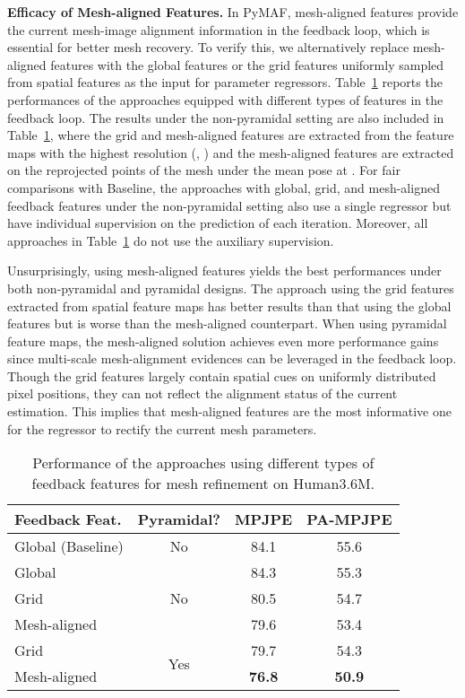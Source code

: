 \documentclass[10pt,twocolumn,letterpaper]{article}
\begin{document}
\textbf{Efficacy of Mesh-aligned Features.}
In PyMAF, mesh-aligned features provide the current mesh-image alignment information in the feedback loop, which is essential for better mesh recovery.
To verify this, we alternatively replace mesh-aligned features with the global features or the grid features uniformly sampled from spatial features as the input for parameter regressors.
Table~\ref{tab:MeshAligned} reports the performances of the approaches equipped with different types of features in the feedback loop.
The results under the non-pyramidal setting are also included in Table~\ref{tab:MeshAligned}, where the grid and mesh-aligned features are extracted from the feature maps with the highest resolution (\ie, ) and the mesh-aligned features are extracted on the reprojected points of the mesh under the mean pose at .
For fair comparisons with Baseline, the approaches with global, grid, and mesh-aligned feedback features under the non-pyramidal setting also use a single regressor but have individual supervision on the prediction of each iteration.
Moreover, all approaches in Table~\ref{tab:MeshAligned} do not use the auxiliary supervision.

Unsurprisingly, using mesh-aligned features yields the best performances under both non-pyramidal and pyramidal designs.
The approach using the grid features extracted from spatial feature maps has better results than that using the global features but is worse than the mesh-aligned counterpart.
When using pyramidal feature maps, the mesh-aligned solution achieves even more performance gains since multi-scale mesh-alignment evidences can be leveraged in the feedback loop.
Though the grid features largely contain spatial cues on uniformly distributed pixel positions, they can not reflect the alignment status of the current estimation.
This implies that mesh-aligned features are the most informative one for the regressor to rectify the current mesh parameters.


\begin{table}[t]
  \centering
  \footnotesize
    \begin{tabular}{l|c|cc}
    \toprule
    Feedback Feat. & Pyramidal? & MPJPE & PA-MPJPE \\
    \midrule
    Global (Baseline) & No    & 84.1  & 55.6 \\
    \midrule
    Global & \multirow{3}[2]{*}{No} & 84.3  & 55.3 \\
    Grid  &       & 80.5  & 54.7 \\
    Mesh-aligned &       &  79.6 &  53.4 \\
    \midrule
    Grid  & \multirow{2}[2]{*}{Yes} & 79.7  & 54.3 \\
    Mesh-aligned &       & \textbf{76.8} & \textbf{50.9} \\
    \bottomrule
    \end{tabular}\caption{Performance of the approaches using different types of feedback features for mesh refinement on Human3.6M.}
    \vspace{-5mm}
  \label{tab:MeshAligned}\end{table}
\end{document}
